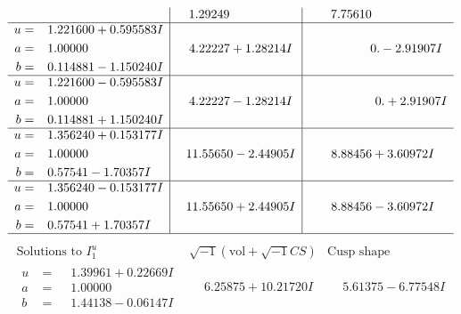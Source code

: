 \documentclass[1p]{elsarticle_modified}
\theoremstyle{definition}
\newcommand{\I}{\sqrt{-1}}
\begin{document}
$$\begin{array}{c|c|c}
 & \phantom{-}1.29249\phantom{ +0.000000I} & \phantom{-}7.75610\phantom{ +0.000000I} \\ \hline\begin{aligned}
u &= \phantom{-}1.221600 + 0.595583 I \\
a &= \phantom{-}1.00000\phantom{ +0.000000I} \\
b &= \phantom{-}0.114881 - 1.150240 I\end{aligned}
 & \phantom{-}4.22227 + 1.28214 I & \phantom{-0.000000 } 0. - 2.91907 I \\ \hline\begin{aligned}
u &= \phantom{-}1.221600 - 0.595583 I \\
a &= \phantom{-}1.00000\phantom{ +0.000000I} \\
b &= \phantom{-}0.114881 + 1.150240 I\end{aligned}
 & \phantom{-}4.22227 - 1.28214 I & \phantom{-0.000000 -}0. + 2.91907 I \\ \hline\begin{aligned}
u &= \phantom{-}1.356240 + 0.153177 I \\
a &= \phantom{-}1.00000\phantom{ +0.000000I} \\
b &= \phantom{-}0.57541 - 1.70357 I\end{aligned}
 & \phantom{-}11.55650 - 2.44905 I & \phantom{-}8.88456 + 3.60972 I \\ \hline\begin{aligned}
u &= \phantom{-}1.356240 - 0.153177 I \\
a &= \phantom{-}1.00000\phantom{ +0.000000I} \\
b &= \phantom{-}0.57541 + 1.70357 I\end{aligned}
 & \phantom{-}11.55650 + 2.44905 I & \phantom{-}8.88456 - 3.60972 I\\
 \hline 
 \end{array}$$\newpage$$\begin{array}{c|c|c}  
\text{Solutions to }I^u_{1}& \I (\text{vol} + \sqrt{-1}CS) & \text{Cusp shape}\\
 \hline 
\begin{aligned}
u &= \phantom{-}1.39961 + 0.22669 I \\
a &= \phantom{-}1.00000\phantom{ +0.000000I} \\
b &= \phantom{-}1.44138 - 0.06147 I\end{aligned}
 & \phantom{-}6.25875 + 10.21720 I & \phantom{-}5.61375 - 6.77548 I \\ \hline\begin{aligned}

\end{aligned}
\end{array}$$
\end{document}
